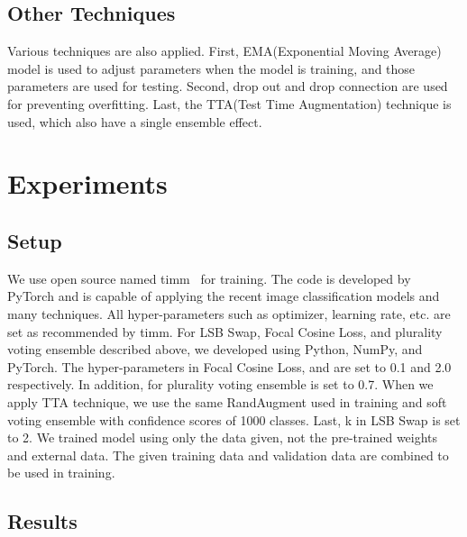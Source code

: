 \documentclass[runningheads]{llncs}
\begin{document}
\subsection{Other Techniques}
Various techniques are also applied. First, EMA(Exponential Moving Average) model is used to adjust parameters when the model is training, and those parameters are used for testing. Second, drop out and drop connection are used for preventing overfitting. Last, the TTA(Test Time Augmentation) technique is used, which also have a single ensemble effect.

\section{Experiments}
\subsection{Setup}
We use open source named timm~\cite{timm} for training. The code is developed by PyTorch and is capable of applying the recent image classification models and many techniques. All hyper-parameters such as optimizer, learning rate, etc. are set as recommended by timm. For LSB Swap, Focal Cosine Loss, and plurality voting ensemble described above, we developed using Python, NumPy, and PyTorch. The hyper-parameters in Focal Cosine Loss,  and  are set to 0.1 and 2.0 respectively. In addition,  for plurality voting ensemble is set to 0.7. When we apply TTA technique, we use the same RandAugment used in training and soft voting ensemble with confidence scores of 1000 classes. Last, k in LSB Swap is set to 2. We trained model using only the data given, not the pre-trained weights and external data. The given training data and validation data are combined to be used in training.

\subsection{Results}
\end{document}

